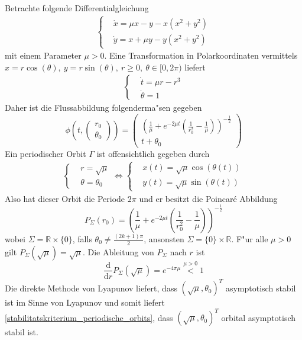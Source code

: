 \documentclass[a4paper, 13pt]{scrreprt}
\theoremstyle{definition} \newtheorem{definition}{Definition}[section]
\newenvironment{beispiel}[1][Beispiel]{\begin{trivlist}
\item[\hskip \labelsep {\bfseries #1}]}{\end{trivlist}}
\newcommand{\RR}{\mathbb{R}}
\begin{document}
\begin{beispiel}
Betrachte folgende Differentialgleichung
\begin{align*}
	\begin{cases}
		&\dot x = \mu x - y - x(x^2+y^2)\\
		&\dot y = x + \mu y - y(x^2+y^2)
	\end{cases}
\end{align*}
mit einem Parameter $\mu > 0$. Eine Transformation in Polarkoordinaten vermittels $x = r \cos(\theta),\ y = r \sin(\theta), \ r\geq 0, \ \theta \in [0,2\pi)$ liefert
\begin{align*}
	\begin{cases}
		&\dot t = \mu r - r ^3\\
		& \dot \theta = 1
	\end{cases}
\end{align*}
Daher ist die Flussabbildung folgenderma"sen gegeben
$$\phi\left(t, \begin{pmatrix} r_0\\ \theta_0 \end{pmatrix}\right) = \begin{pmatrix}
	\left(\frac 1\mu + e^{-2\mu t}\left(\frac{1}{r_0^2} - \frac 1\mu\right)\right)^{-\frac 12}\\
	t + \theta_0
\end{pmatrix}$$
Ein periodischer Orbit $\Gamma$ ist offensichtlich gegeben durch 
\begin{align*}
\begin{cases}
 &r = \sqrt\mu\\
 &\theta = \theta_0
\end{cases}
\Leftrightarrow
\begin{cases}
 & x(t) = \sqrt\mu \cos\left(\theta(t)\right)\\
 & y(t) = \sqrt\mu \sin\left(\theta(t)\right)
\end{cases}
\end{align*}
Also hat dieser Orbit die Periode $2\pi$ und er besitzt die Poincar\'{e} Abbildung
$$ P_\Sigma (r_0) = \left(\frac 1\mu + e^{-2\mu t}\left(\frac{1}{r_0^2} - \frac 1\mu\right)\right)^{-\frac 12}$$
wobei $\Sigma = \RR\times\{0\}$, falls $\theta_0 \neq \frac{(2k+1)\pi}{2}$, ansonsten $\Sigma = \{0\}\times\RR$. F"ur alle $\mu > 0$ gilt $P_\Sigma(\sqrt \mu) = \sqrt \mu$. Die Ableitung von $P_\Sigma$ nach $r$ ist 
$$\frac{\mathrm d}{\mathrm dr} P_\Sigma(\sqrt \mu) = e^{-4 \pi \mu} \stackrel{\mu > 0} < 1$$
Die direkte Methode von Lyapunov liefert, dass $(\sqrt \mu, \theta_0)^T$ asymptotisch stabil ist im Sinne von Lyapunov und somit liefert \eqref{stabilitatskriterium_periodische_orbits}, dass $(\sqrt \mu, \theta_0)^T$ orbital asymptotisch stabil ist.
\end{beispiel}
\end{document}
